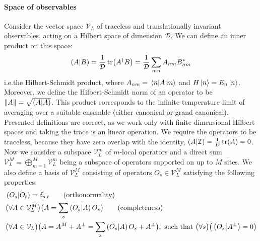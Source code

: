 \paragraph{Space of observables}Consider the vector space \(\mathcal{V}_L\) of traceless and translationally invariant
observables, acting on a Hilbert space of dimension \(\mathcal{D}\). We can define an inner product on this space:
\begin{equation}
  \left(A \middle| B\right) = \frac{1}{\mathcal{D}}\tr(A^{\dagger}B) = \frac{1}{\mathcal{D}} \sum_{mn} A_{nm}B_{nm}^{\ast}
\end{equation}
i.e.\;the Hilbert-Schmidt product, where \(A_{nm} = \matrixel{n}{A}{m}\) and \(H\ket{n} = E_n \ket{n}\).
Moreover, we define the Hilbert-Schmidt norm of an operator to be \(\norm{A} = \sqrt{\left(A \middle| A\right)}\).
This product corresponds to the infinite temperature limit of averaging over a suitable ensemble (either
canonical or grand canonical).
Presented definitions are correct, as we work only with finite dimensional Hilbert spaces and taking the trace is an
linear operation. We require the operators to be traceless, because they have zero overlap with the identity, \(\left(A|\mathcal{I}\right)=\frac{1}{D}\tr(A) = 0\).
Now we consider a subspace \(\mathcal{V}_L^m\) of \(m\)-local operators and a direct sum
\(\mathcal{V}_L^M = \bigoplus_{m = 1}^M \mathcal{V}_L^m\) being a subspace of operators supported on up to \(M\) sites.
We also define a basis of \(\mathcal{V}_L^M\) consisting of operators \(O_s\in \mathcal{V}_L^M\)
satisfying the following properties:
\begin{align}
   & \hs{O_s}{O_{t}} = \delta_{s,t} \tag{\text{orthonormality}}                                    \nonumber{}\\
   & \big(\forall A \in \mathcal{V}_L^M\big) \big(A = \sum_s \hs{O_s}{A} O_s\big) \tag{\text{completeness}}   \nonumber{}\\
   & \big(\forall A \in \mathcal{V}_L \big) \big( A = A^M + A^{\perp} = \sum_s \hs{O_s}{A} O_s + A^{\perp}\big) ,
  \text{ such that } \big(\forall s\big) \big( \hs{O_s}{A^{\perp}} = 0\big)\label{eq:basis}
\end{align}


